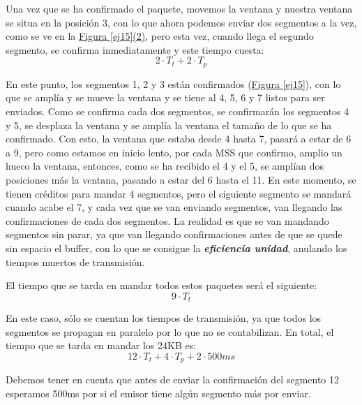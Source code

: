 \documentclass[10pt,a4paper,spanish]{report}
\begin{document}
Una vez que se ha confirmado el paquete, movemos la ventana y nuestra ventana se situa en la posición 3, con lo que ahora podemos enviar dos segmentos a la vez, como se ve en la \hyperref[ej15]{Figura \ref*{ej15}(2)}, pero esta vez, cuando llega el segundo segmento, se confirma inmediatamente y este tiempo cuesta:
\begin{displaymath}
    2\cdot T_t + 2 \cdot T_p
\end{displaymath}

En este punto, los segmentos 1, 2 y 3 están confirmados (\hyperref[ej15]{Figura \ref*{ej15}}), con lo que se amplía y se mueve la ventana y se tiene al 4, 5, 6 y 7 listos para ser enviados. Como se confirma cada dos segmentos, se confirmarán los segmentos 4 y 5, se desplaza la ventana y se amplía la ventana el tamaño de lo que se ha confirmado. Con esto, la ventana que estaba desde 4 hasta 7, pasará a estar de 6 a 9, pero como estamos en inicio lento, por cada MSS que confirmo, amplio un hueco la ventana, entonces, como se ha recibido el 4 y el 5, se amplían dos posiciones más la ventana, pasando a estar del 6 hasta el 11. En este momento, se tienen créditos para mandar 4 segmentos, pero el siguiente segmento se mandará cuando acabe el 7, y cada vez que se van enviando segmentos, van llegando las confirmaciones de cada dos segmentos. La realidad es que se van mandando segmentos sin parar, ya que van llegando confirmaciones antes de que se quede sin espacio el buffer, con lo que se consigue la \textbf{\textit{\textcolor{tema3}{eficiencia unidad}}}, anulando los tiempos muertos de transmisión.

El tiempo que se tarda en mandar todos estos paquetes será el siguiente:
\begin{displaymath}
    9\cdot T_t
\end{displaymath}

En este caso, sólo se cuentan los tiempos de transmisión, ya que todos los segmentos se propagan en paralelo por lo que no se contabilizan. En total, el tiempo que se tarda en mandar los 24KB es:
\begin{displaymath}
    12\cdot T_t + 4 \cdot T_p + 2 \cdot 500 ms
\end{displaymath}

Debemos tener en cuenta que antes de enviar la confirmación del segmento 12 esperamos 500ms por si el emisor tiene algún segmento más por enviar.

\end{document}
